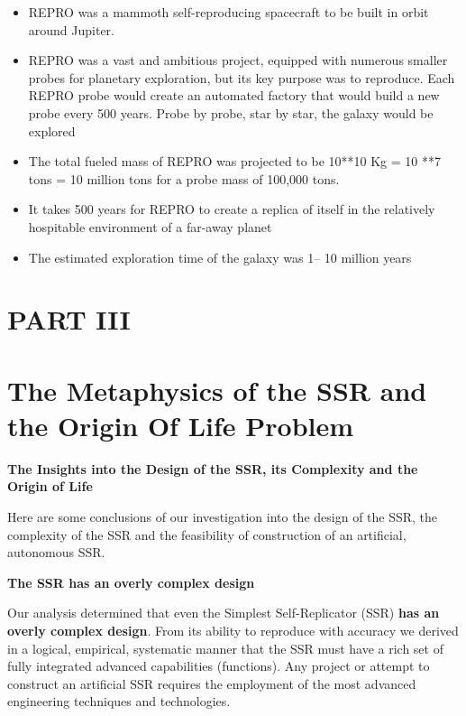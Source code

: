 \documentclass[letterpaper]{article}
\begin{document}
\begin{itemize}
\item REPRO was a mammoth self-reproducing spacecraft to be built in
orbit around Jupiter.
\item REPRO was a vast and ambitious project, equipped with numerous
smaller probes for planetary exploration, but its key purpose was to
reproduce. Each REPRO probe would create an automated factory that
would build a new probe every 500 years. Probe by probe, star by star,
the galaxy would be explored 
\item The total fueled mass of REPRO was projected to be 10**10 Kg = 10
**7 tons = 10 million tons for a probe mass of 100,000 tons.
\item It takes 500 years for REPRO to create a replica of itself in the
relatively hospitable environment of a far-away planet
\item The estimated exploration time of the galaxy was 1– 10 million
years
\end{itemize}
\clearpage\section[PART III]{PART III}
\hypertarget{RefHeading3158306210128}{}\section[The Metaphysics of the
SSR and the Origin Of Life Problem]{The Metaphysics of the SSR and the
Origin Of Life Problem}
\hypertarget{RefHeading3160306210128}{}
\bigskip

{\bfseries
\hypertarget{RefHeading3162306210128}{}The Insights into the Design of
the SSR, its Complexity and the Origin of Life}

Here are some conclusions of our investigation into the design of the
SSR, the complexity of the SSR and the feasibility of construction of
an artificial, autonomous SSR.


\bigskip

\textbf{The SSR has an overly complex design}


\bigskip

Our analysis determined that even the Simplest Self-Replicator (SSR)
\textbf{has an overly complex design}. From its ability to reproduce
with accuracy we derived in a logical, empirical, systematic manner
that the SSR must have a rich set of fully integrated advanced
capabilities (functions).  Any project or attempt to construct an
artificial SSR requires the employment of the most advanced engineering
techniques and technologies.
\end{document}

